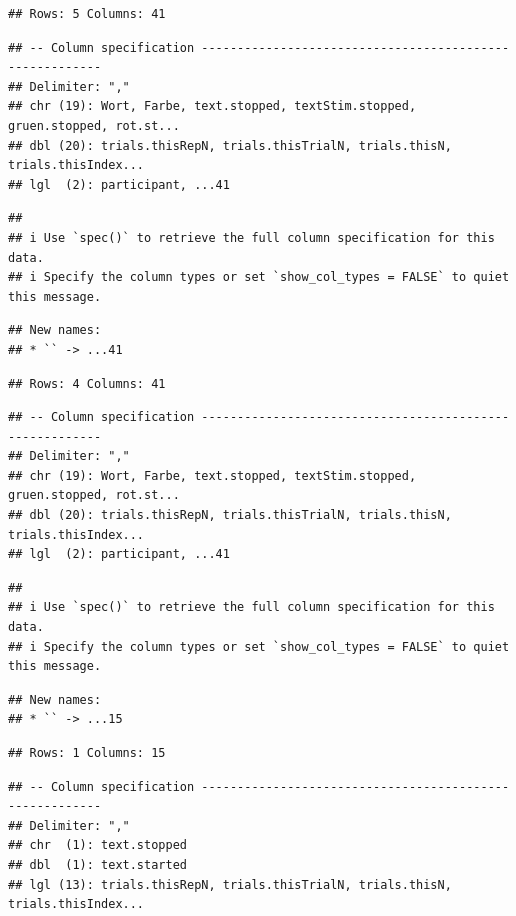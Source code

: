 \documentclass[
]{book}
\begin{document}
\begin{verbatim}
## Rows: 5 Columns: 41
\end{verbatim}

\begin{verbatim}
## -- Column specification --------------------------------------------------------
## Delimiter: ","
## chr (19): Wort, Farbe, text.stopped, textStim.stopped, gruen.stopped, rot.st...
## dbl (20): trials.thisRepN, trials.thisTrialN, trials.thisN, trials.thisIndex...
## lgl  (2): participant, ...41
\end{verbatim}

\begin{verbatim}
## 
## i Use `spec()` to retrieve the full column specification for this data.
## i Specify the column types or set `show_col_types = FALSE` to quiet this message.
\end{verbatim}

\begin{verbatim}
## New names:
## * `` -> ...41
\end{verbatim}

\begin{verbatim}
## Rows: 4 Columns: 41
\end{verbatim}

\begin{verbatim}
## -- Column specification --------------------------------------------------------
## Delimiter: ","
## chr (19): Wort, Farbe, text.stopped, textStim.stopped, gruen.stopped, rot.st...
## dbl (20): trials.thisRepN, trials.thisTrialN, trials.thisN, trials.thisIndex...
## lgl  (2): participant, ...41
\end{verbatim}

\begin{verbatim}
## 
## i Use `spec()` to retrieve the full column specification for this data.
## i Specify the column types or set `show_col_types = FALSE` to quiet this message.
\end{verbatim}

\begin{verbatim}
## New names:
## * `` -> ...15
\end{verbatim}

\begin{verbatim}
## Rows: 1 Columns: 15
\end{verbatim}

\begin{verbatim}
## -- Column specification --------------------------------------------------------
## Delimiter: ","
## chr  (1): text.stopped
## dbl  (1): text.started
## lgl (13): trials.thisRepN, trials.thisTrialN, trials.thisN, trials.thisIndex...
\end{verbatim}
\end{document}
